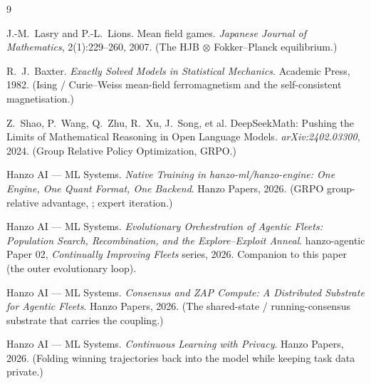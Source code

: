 \documentclass[11pt]{article}
\begin{document}
\begin{thebibliography}{9}

J.-M.\ Lasry and P.-L.\ Lions.
\newblock Mean field games.
\newblock \emph{Japanese Journal of Mathematics}, 2(1):229--260, 2007. (The HJB $\otimes$ Fokker--Planck
equilibrium.)

R.\ J.\ Baxter.
\newblock \emph{Exactly Solved Models in Statistical Mechanics}.
\newblock Academic Press, 1982. (Ising / Curie--Weiss mean-field ferromagnetism and the self-consistent
magnetisation.)

Z.\ Shao, P.\ Wang, Q.\ Zhu, R.\ Xu, J.\ Song, et al.
\newblock DeepSeekMath: Pushing the Limits of Mathematical Reasoning in Open Language Models.
\newblock \emph{arXiv:2402.03300}, 2024. (Group Relative Policy Optimization, GRPO.)

Hanzo AI --- ML Systems.
\newblock \emph{Native Training in hanzo-ml/hanzo-engine: One Engine, One Quant Format, One Backend}.
\newblock Hanzo Papers, 2026. (GRPO group-relative advantage, ; expert
iteration.)

Hanzo AI --- ML Systems.
\newblock \emph{Evolutionary Orchestration of Agentic Fleets: Population Search, Recombination, and the
Explore--Exploit Anneal}.
\newblock hanzo-agentic Paper 02, \emph{Continually Improving Fleets} series, 2026. Companion to this paper (the
outer evolutionary loop).

Hanzo AI --- ML Systems.
\newblock \emph{Consensus and ZAP Compute: A Distributed Substrate for Agentic Fleets}.
\newblock Hanzo Papers, 2026. (The shared-state / running-consensus substrate that carries the coupling.)

Hanzo AI --- ML Systems.
\newblock \emph{Continuous Learning with Privacy}.
\newblock Hanzo Papers, 2026. (Folding winning trajectories back into the model while keeping task data
private.)

\end{thebibliography}
\end{document}
